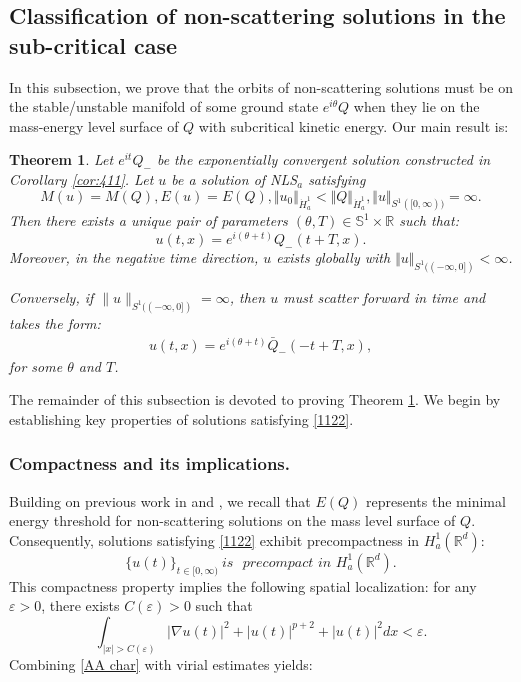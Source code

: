 \documentclass[12pt]{amsart}
\newcommand{\R}{\mathbb R}
\newcommand{\eps}{\varepsilon}
\newcommand{\nha}{H^1_a}
\newtheorem{theorem}{Theorem}[section]
\begin{document}
\subsection{Classification of non-scattering solutions in the sub-critical case\label{decay_sub}}

In this subsection, we prove that the orbits of non-scattering solutions must be on the stable/unstable manifold of some ground state $e^{i\theta} Q$ when they lie on the mass-energy level surface of $Q$ with subcritical kinetic energy. Our main result is: 

\begin{theorem}
\label{thm: subcase} Let $e^{it}Q_-$ be the exponentially convergent solution constructed in Corollary \ref{cor:411}. Let $u$ be a solution of NLS$_{a}$ satisfying 
\begin{equation}
M(u)=M(Q),E(u)=E(Q),\Vert u_{0}\Vert _{\dot{H}_{a}^{1}}<\Vert Q\Vert _{\dot{H%
}_{a}^{1}},\Vert u\Vert _{S^1([0,\infty ))}=\infty .  \label{1122}
\end{equation}%
Then there exists a unique pair of parameters $(\theta, T)\in \mathbb S^1\times \R$ such
that:
\begin{equation}
u(t,x)=e^{i(\theta +t)}Q_{-}(t+T,x).  \label{357}
\end{equation}%
Moreover, in the negative time direction, $u$ exists globally with $\Vert u\Vert
_{S^1((-\infty ,0])}<\infty $.

Conversely, if $\|u\|_{S^1((-\infty, 0])}=\infty$, then $u$ must  scatter forward in time and takes the form:  
\begin{align*}
u(t,x)=e^{i(\theta+t)}\bar Q_-(-t+T, x),
\end{align*}
for some $\theta$ and $T$. 
\end{theorem}



The remainder of this subsection is devoted to proving Theorem \ref{thm: subcase}. We begin by establishing key properties of solutions satisfying \eqref{1122}. 


\subsubsection{Compactness and its implications.}

Building on previous work in
\cite{KMVZ17} and \cite{LMM18}, we recall that $E(Q)$ represents the minimal energy threshold for non-scattering solutions on the mass level surface of $Q$. Consequently, solutions satisfying \eqref{1122} exhibit precompactness in $\nha(\R^d)$:
\begin{equation}
\{u(t)\}_{t\in \lbrack 0,\infty )}\mathit{\ is}\text{ }\textit{precompact in } H_{a}^{1}(\mathbb{R}^{d}). \label{precomp}
\end{equation}%
This compactness property implies the following spatial localization: for any $\eps>0$, 
there exists $C(\eps)>0$ such that 
\begin{equation}
\int_{|x|>C(\varepsilon )}|\nabla
u(t)|^{2}+|u(t)|^{p+2}+|u(t)|^{2}dx<\varepsilon .  \label{AA char}
\end{equation}
Combining \eqref{AA char} with virial estimates yields: 
\end{document}
